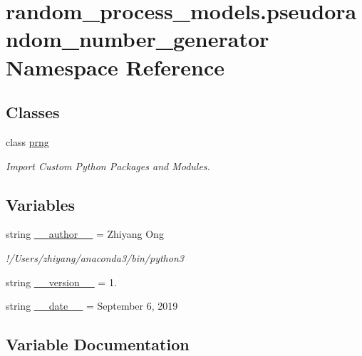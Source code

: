 \hypertarget{namespacerandom__process__models_1_1pseudorandom__number__generator}{}\section{random\+\_\+process\+\_\+models.\+pseudorandom\+\_\+number\+\_\+generator Namespace Reference}
\label{namespacerandom__process__models_1_1pseudorandom__number__generator}
\subsection*{Classes}
\begin{DoxyCompactItemize}
\item 
class \hyperlink{classrandom__process__models_1_1pseudorandom__number__generator_1_1prng}{prng}
\begin{DoxyCompactList}\small\item\em Import Custom Python Packages and Modules. \end{DoxyCompactList}\end{DoxyCompactItemize}
\subsection*{Variables}
\begin{DoxyCompactItemize}
\item 
string \hyperlink{namespacerandom__process__models_1_1pseudorandom__number__generator_a84092bcc9369063613d90d32f1b312c1}{\+\_\+\+\_\+author\+\_\+\+\_\+} = \textquotesingle{}Zhiyang Ong\textquotesingle{}
\begin{DoxyCompactList}\small\item\em !/\+Users/zhiyang/anaconda3/bin/python3 \end{DoxyCompactList}\item 
string \hyperlink{namespacerandom__process__models_1_1pseudorandom__number__generator_a86f3eea01762559cc8455c47914c636b}{\+\_\+\+\_\+version\+\_\+\+\_\+} = \textquotesingle{}1.\textquotesingle{}
\item 
string \hyperlink{namespacerandom__process__models_1_1pseudorandom__number__generator_a331fc6d6b9f620aa4f2c18a74db5cb07}{\+\_\+\+\_\+date\+\_\+\+\_\+} = \textquotesingle{}September 6, 2019\textquotesingle{}
\end{DoxyCompactItemize}


\subsection{Variable Documentation}
\hypertarget{namespacerandom__process__models_1_1pseudorandom__number__generator_a84092bcc9369063613d90d32f1b312c1}{}
